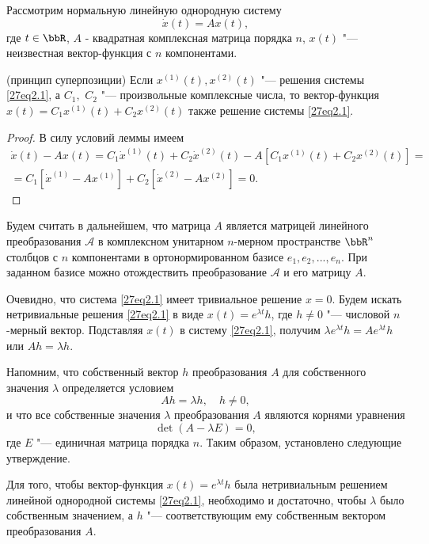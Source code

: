 Рассмотрим нормальную линейную однородную систему
\begin{equation}\label{27eq2.1}
\dot x(t) = Ax(t),
\end{equation}
где $t\in\bbR$, $A$ - квадратная комплексная матрица порядка $n$, $x(t)$ "--- неизвестная вектор-функция с $n$ компонентами.

\begin{lemm}\label{27lemm1} (принцип суперпозиции)
Если $x^{(1)}(t), x^{(2)}(t)$ "--- решения системы \eqref{27eq2.1}, а  $C_1,$ $C_2$ "--- произвольные комплексные числа, то вектор-функция $x(t)=C_1x^{(1)}(t)+C_2x^{(2)}(t)$ также решение системы \eqref{27eq2.1}.
\end{lemm}
\begin{proof}
В силу условий леммы имеем
\begin{multline*}
\dot x(t)-Ax(t)=C_1\dot x^{(1)}(t)+C_2\dot{x}^{(2)}(t)-A\left[C_1{x}^{(1)}(t)+C_2{x}^{(2)}(t)\right]=\\=C_1\left[\dot{x}^{(1)}-Ax^{(1)}\right]+C_2\left[\dot{x}^{(2)}-Ax^{(2)}\right]=0.\tag*{\qedhere}
\end{multline*}
\end{proof}
Будем считать в дальнейшем, что матрица $A$ является матрицей линейного преобразования $\mathcal A$ в комплексном унитарном $n$-мерном пространстве $\bbR^n$ столбцов с $n$ компонентами в ортонормированном базисе $e_1,e_2,...,e_n$. При заданном базисе можно отождествить преобразование $\mathcal A$ и его матрицу $A$.

Очевидно, что система \eqref{27eq2.1} имеет тривиальное решение $x=0$. Будем искать нетривиальные решения \eqref{27eq2.1} в виде $x(t)=e^{\lambda t}h$, где $h\neq 0$ "--- числовой $n$-мерный вектор. Подставляя $x(t)$ в систему \eqref{27eq2.1}, получим $\lambda e^{\lambda t}h=Ae^{\lambda t}h$ или $Ah=\lambda h$.

Напомним, что собственный вектор $h$ преобразования $A$ для собственного значения $\lambda$ определяется условием
$$
Ah=\lambda h,\quad h\neq 0,
$$
и что все собственные значения $\lambda$ преобразования $A$ являются корнями уравнения
$$
\det(A-\lambda E)=0,
$$
где $E$ "--- единичная матрица порядка $n$. Таким образом, установлено следующие утверждение.

\begin{lemm}\label{27lemm2}
Для того, чтобы вектор-функция $x(t)=e^{\lambda t}h$ была нетривиальным решением линейной однородной системы \eqref{27eq2.1}, необходимо и достаточно, чтобы $\lambda$ было собственным значением, а $h$ "--- соответствующим ему собственным вектором преобразования $A$.
\end{lemm}

